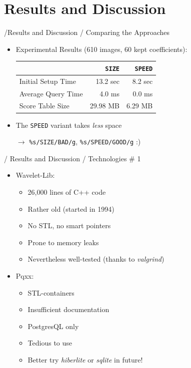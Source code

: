 \documentclass{beamer}
\newcommand\rarrow{$\longrightarrow$ } %
\begin{document}
\section{Results and Discussion}

\begin{frame}{/Results and Discussion / Comparing the Approaches}

  \begin{itemize}
    \item Experimental Results (610 images, 60 kept coefficients):
      \begin{center}
        \begin{tabular}{|l|r|r|}\hline
          ~ & \texttt{SIZE} & \texttt{SPEED} \\ \hline\hline
          Initial Setup Time & 13.2 sec & 8.2 sec \\ \hline
          Average Query Time & 4.0 ms  & 0.0 ms \\ \hline
          Score Table Size & 29.98 MB  & 6.29 MB \\ \hline
        \end{tabular}
      \end{center}
      \medskip

        \pause
      \item The \texttt{SPEED} variant takes \emph{less} space

        \pause
        \rarrow \texttt{\%s/SIZE/BAD/g}\pause, \texttt{\%s/SPEED/GOOD/g} \pause :)

  \end{itemize}

\end{frame}

\begin{frame}{/ Results and Discussion / Technologies \# 1}

  \begin{itemize}
  \item Wavelet-Lib:
    \begin{itemize}
    \item 26,000 lines of C++ code
    \item Rather old (started in 1994)
    \item No STL, no smart pointers
    \item Prone to memory leaks
    \item Nevertheless well-tested (thanks to \emph{valgrind})
    \end{itemize}
    \pause
  \item Pqxx:
    \begin{itemize}
    \item STL-containers
    \item Insufficient documentation
    \item PostgresQL only
    \item Tedious to use
    \item Better try \emph{hiberlite} or \emph{sqlite} in future!
    \end{itemize}
  \end{itemize}
  
\end{frame}
\end{document}
